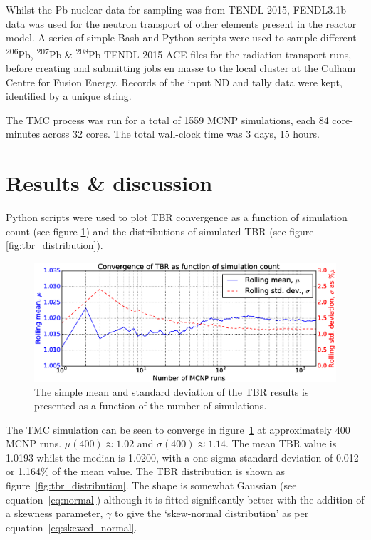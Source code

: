 Whilst the Pb nuclear data for sampling was from TENDL-2015, FENDL3.1b data was used for the neutron transport of other elements present in the reactor model. A series of simple Bash and Python scripts were used to sample different \textsuperscript{206}Pb, \textsuperscript{207}Pb \& \textsuperscript{208}Pb TENDL-2015 ACE files for the radiation transport runs, before creating and submitting jobs en masse to the local cluster at the Culham Centre for Fusion Energy. Records of the input ND and tally data were kept, identified by a unique string.

The TMC process was run for a total of 1559 MCNP simulations, each 84 core-minutes across 32 cores. The total wall-clock time was 3 days, 15 hours.

\section{Results \& discussion}
Python scripts were used to plot TBR convergence as a function of simulation count (see figure \ref{fig:convergence}) and the distributions of simulated TBR (see figure \ref{fig:tbr_distribution}).

\begin{figure}[H]
	\includegraphics[width=\textwidth]{hcll_convergence_1559}
	\caption{The simple mean and standard deviation of the TBR results is presented as a function of the number of simulations.}
	\label{fig:convergence}
\end{figure}

The TMC simulation can be seen to converge in figure~\ref{fig:convergence} at approximately 400 MCNP runs. $\mu(400) \approx 1.02$ and $\sigma(400) \approx 1.14$. The mean TBR value is 1.0193 whilst the median is 1.0200, with a one sigma standard deviation of 0.012 or 1.164\% of the mean value. The TBR distribution is shown as figure~\ref{fig:tbr_distribution}. The shape is somewhat Gaussian (see equation~\ref{eq:normal}) although it is fitted significantly better with the addition of a skewness parameter, $\gamma$ to give the `skew-normal distribution' as per equation~\ref{eq:skewed_normal}. 

